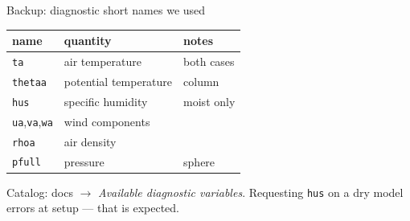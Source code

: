 \documentclass[aspectratio=169,11pt]{beamer}
\begin{document}
\begin{frame}{Backup: diagnostic short names we used}
\begin{center}
\begin{tabular}{lll}
  \toprule
  name & quantity & notes \\
  \midrule
  \texttt{ta} & air temperature & both cases \\
  \texttt{thetaa} & potential temperature & column \\
  \texttt{hus} & specific humidity & moist only \\
  \texttt{ua},\texttt{va},\texttt{wa} & wind components & \\
  \texttt{rhoa} & air density & \\
  \texttt{pfull} & pressure & sphere \\
  \bottomrule
\end{tabular}
\end{center}
\vspace{0.5em}
Catalog: docs $\to$ \emph{Available diagnostic variables}. Requesting
\texttt{hus} on a dry model errors at setup --- that is expected.
\end{frame}
\end{document}
